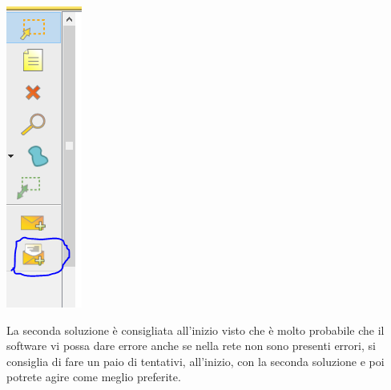 \begin{center}
    \includegraphics[width=0.1\linewidth]{images/04.debugging-rete/07.png}
\end{center}

La seconda soluzione è consigliata all'inizio visto che è molto probabile che il software vi possa dare errore anche se nella rete non sono presenti errori, si consiglia di fare un paio di tentativi, all’inizio, con la seconda soluzione e poi potrete agire come meglio preferite.
